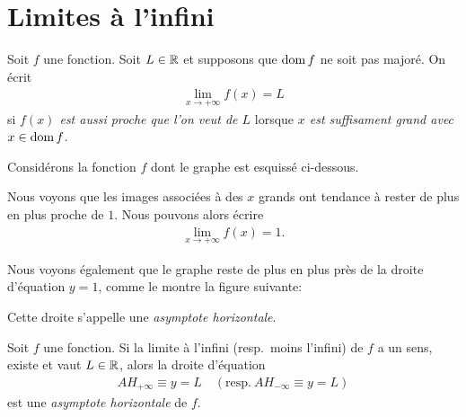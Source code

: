 \documentclass[main.tex]{subfiles}
\begin{document}
\section{Limites à l'infini}

\begin{definition}

    Soit $f$ une fonction.
    Soit $L \in \mathbb{R}$ et supposons que $\operatorname{dom} f$ ne soit pas majoré.
    On écrit
    \begin{align}
        \lim_{x \to +\infty} f(x) = L
    \end{align}
    si \emph{$f(x)$ est aussi proche que l'on veut de $L$}
    lorsque \emph{$x$ est suffisament grand avec $x \in \operatorname{dom} f$}.
\end{definition}

\begin{example}

    Considérons la fonction $f$ dont le graphe est esquissé ci-dessous.
    \begin{center}
        \begin{plot}{0.25}{-1}{-3}{30}{5}
        \end{plot}
    \end{center}

    Nous voyons que les images associées à des $x$ grands ont tendance à rester de plus en plus proche de $1$.
    Nous pouvons alors écrire
    \begin{align*}
        \lim_{x \to +\infty} f(x) = 1.
    \end{align*}

    Nous voyons également que le graphe reste de plus en plus près de la droite d'équation $y = 1$,
    comme le montre la figure suivante:
    \begin{center}
        \begin{plot}{0.25}{-1}{-3}{30}{5}
        \end{plot}
    \end{center}

    Cette droite s'appelle une \emph{asymptote horizontale}.
\end{example}

\begin{definition}

    Soit $f$ une fonction.
    Si la limite à l'infini (resp.\ moins l'infini) de $f$ a un sens, existe et vaut $L \in \mathbb{R}$,
    alors la droite d'équation
    \begin{align}
        AH_{+\infty} \equiv y = L
        \quad
        \left(\text{resp.}\ AH_{-\infty} \equiv y = L\right)
    \end{align}
    est une \emph{asymptote horizontale} de $f$.
\end{definition}
\end{document}
